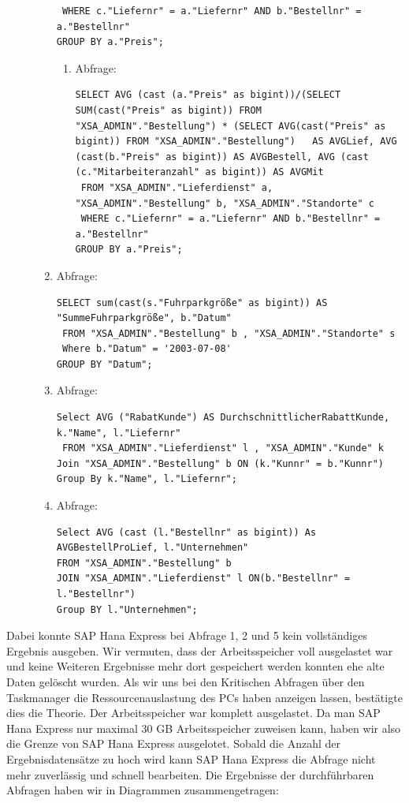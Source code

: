 \documentclass[a4paper, 12pt]{scrartcl}
\begin{document}
\begin{description}
\begin{enumerate}
\begin{verbatim}
 WHERE c."Liefernr" = a."Liefernr" AND b."Bestellnr" = a."Bestellnr"
GROUP BY a."Preis";
		\end{verbatim}
		\begin{enumerate}
			\item Abfrage:
			\begin{verbatim}
SELECT AVG (cast (a."Preis" as bigint))/(SELECT SUM(cast("Preis" as bigint)) FROM "XSA_ADMIN"."Bestellung") * (SELECT AVG(cast("Preis" as bigint)) FROM "XSA_ADMIN"."Bestellung")   AS AVGLief, AVG (cast(b."Preis" as bigint)) AS AVGBestell, AVG (cast (c."Mitarbeiteranzahl" as bigint)) AS AVGMit 
 FROM "XSA_ADMIN"."Lieferdienst" a, "XSA_ADMIN"."Bestellung" b, "XSA_ADMIN"."Standorte" c
 WHERE c."Liefernr" = a."Liefernr" AND b."Bestellnr" = a."Bestellnr"
GROUP BY a."Preis";
			\end{verbatim}
		\end{enumerate}
		\item Abfrage:
		\begin{verbatim}
SELECT sum(cast(s."Fuhrparkgröße" as bigint)) AS "SummeFuhrparkgröße", b."Datum"
 FROM "XSA_ADMIN"."Bestellung" b , "XSA_ADMIN"."Standorte" s
 Where b."Datum" = '2003-07-08'
GROUP BY "Datum"; 
		\end{verbatim}
		\item Abfrage: 
		\begin{verbatim}
Select AVG ("RabatKunde") AS DurchschnittlicherRabattKunde, k."Name", l."Liefernr"
 FROM "XSA_ADMIN"."Lieferdienst" l , "XSA_ADMIN"."Kunde" k Join "XSA_ADMIN"."Bestellung" b ON (k."Kunnr" = b."Kunnr") 
Group By k."Name", l."Liefernr";
		\end{verbatim}
		\item Abfrage: 
		\begin{verbatim}
Select AVG (cast (l."Bestellnr" as bigint)) As AVGBestellProLief, l."Unternehmen"
FROM "XSA_ADMIN"."Bestellung" b 
JOIN "XSA_ADMIN"."Lieferdienst" l ON(b."Bestellnr" = l."Bestellnr")
Group BY l."Unternehmen"; 
		\end{verbatim}
		
		
	\end{enumerate}
\end{description}
Dabei konnte SAP Hana Express bei Abfrage 1, 2 und 5 kein vollständiges Ergebnis ausgeben. 
Wir vermuten, dass der Arbeitsspeicher voll ausgelastet war und keine Weiteren Ergebnisse mehr dort gespeichert werden konnten ehe alte Daten gelöscht wurden.
Als wir uns bei den Kritischen Abfragen über den Taskmanager die Ressourcenauslastung des PCs haben anzeigen lassen, bestätigte dies die Theorie. Der Arbeitsspeicher war komplett ausgelastet.
Da man SAP Hana Express nur maximal 30 GB Arbeitsspeicher zuweisen kann, haben wir also die Grenze von SAP Hana Express ausgelotet.
Sobald die Anzahl der Ergebnisdatensätze zu hoch wird kann SAP Hana Express die Abfrage nicht mehr zuverlässig und schnell bearbeiten.
Die Ergebnisse der durchführbaren Abfragen haben wir in Diagrammen zusammengetragen:
\end{document}
